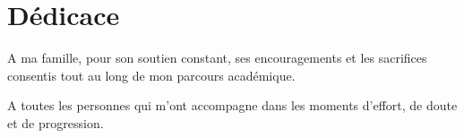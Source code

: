 \chapter*{Dédicace}

A ma famille, pour son soutien constant, ses encouragements et les sacrifices consentis tout au long de mon parcours académique.

A toutes les personnes qui m'ont accompagne dans les moments d'effort, de doute et de progression.

